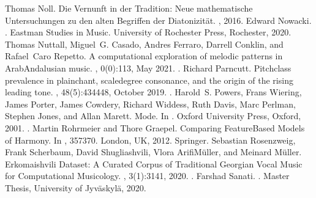 \documentclass[letterpaper,10pt,english]{sphinxmanual}
\begin{document}
\begin{sphinxthebibliography}{10}
\sphinxAtStartPar
Thomas Noll. Die Vernunft in der Tradition: Neue mathematische Untersuchungen zu den alten Begriffen der Diatonizität. , 2016.
\sphinxAtStartPar
Edward Nowacki. . Eastman Studies in Music. University of Rochester Press, Rochester, 2020.
\sphinxAtStartPar
Thomas Nuttall, Miguel G. Casado, Andres Ferraro, Darrell Conklin, and Rafael Caro Repetto. A computational exploration of melodic patterns in Arab\sphinxhyphen{}Andalusian music. , 0(0):1\textendash{}13, May 2021. .
\sphinxAtStartPar
Richard Parncutt. Pitch\sphinxhyphen{}class prevalence in plainchant, scale\sphinxhyphen{}degree consonance, and the origin of the rising leading tone. , 48(5):434\textendash{}448, October 2019. .
\sphinxAtStartPar
Harold S. Powers, Frans Wiering, James Porter, James Cowdery, Richard Widdess, Ruth Davis, Marc Perlman, Stephen Jones, and Allan Marett. Mode. In . Oxford University Press, Oxford, 2001. .
\sphinxAtStartPar
Martin Rohrmeier and Thore Graepel. Comparing Feature\sphinxhyphen{}Based Models of Harmony. In , 357\textendash{}370. London, UK, 2012. Springer.
\sphinxAtStartPar
Sebastian Rosenzweig, Frank Scherbaum, David Shugliashvili, Vlora Arifi\sphinxhyphen{}Müller, and Meinard Müller. Erkomaishvili Dataset: A Curated Corpus of Traditional Georgian Vocal Music for Computational Musicology. , 3(1):31\textendash{}41, 2020. .
\sphinxAtStartPar
Farshad Sanati. . Master Thesis, University of Jyväskylä, 2020.

\end{sphinxthebibliography}
\end{document}
